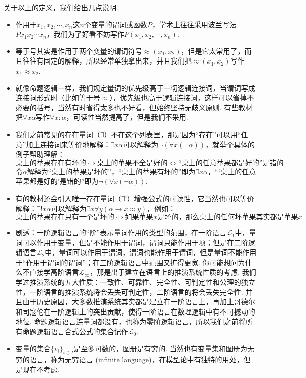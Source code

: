 \documentclass[main.tex]{subfiles}
\begin{document}
关于以上的定义，我们给出几点说明.
\begin{itemize}
    \item 作用于\(x_1, x_2, \cdots, x_n\)这\(n\)个变量的谓词或函数\(P\)，学术上往往采用波兰写法\(Px_1x_2\cdots x_n\)，我们为了好看不妨写作\(P(x_1,x_2,\cdots,x_n)\).
    \item 等于号其实是作用于两个变量的谓词符号\(\approx(x_1,x_2)\)，但是它太常用了，而且往往有固定的解释，所以经常单独拿出来，并且我们把\(\approx(x_1,x_2)\)写作\(x_1 \approx x_2\). 
    \item 就像命题逻辑一样，我们规定量词的优先级高于一切逻辑连接词，当谓词写成连接词形式时（比如等于号\(\approx\)），优先级也高于逻辑连接词，这样可以省掉不必要的括号，当然有时省得太多也不好看，但始终坚持无歧义原则. 有些教材把\(\forall x \alpha\)写作\(\forall x: \alpha\)，可读性当然提高了，但是我们不采用.
    \item 我们之前常见的存在量词（\(\exists\)）不在这个列表里，那是因为“存在”可以用“任意”加上连接词来等价地解释：\(\exists x \alpha\)可以解释为\(\neg(\forall x (\neg\alpha))\)，就举个具体的例子帮助理解：
    \[\mbox{桌上的苹果存在有坏的} \Leftrightarrow \mbox{桌上的苹果不全是好的} \Leftrightarrow \mbox{“桌上的任意苹果都是好的”是错的}\]
    令\(\alpha\)解释为“桌上的苹果是坏的”，“桌上的苹果有坏的”即为\(\exists x \alpha\)，“‘桌上的任意苹果都是好的’是错的”即为\(\neg(\forall x (\neg\alpha))\).
    \item 有的教材还会引入唯一存在量词（\(\exists!\)）增强公式的可读性，它当然也可以等价解释：\(\exists! x \alpha\)可以解释为\(\exists x \forall y(\alpha \to x \approx y)\)，例如：
    \[\mbox{桌上的苹果存在只有一个是坏的} \Leftrightarrow \mbox{如果苹果}x\mbox{是坏的，那么桌上的任何坏苹果其实都是苹果}x \]
    \item 剧透：一阶逻辑语言的“阶”表示量词作用的类型的范围，在一阶语言\(\mathcal{L}_1\)中，量词可以作用于变量，但是不能作用于谓词，谓词只能作用于项；但是在二阶逻辑语言\(\mathcal{L}_2\)中，量词可以作用于谓词，谓词也能作用于谓词，但是量词不能作用于“作用于谓词的谓词”；在三阶逻辑语言中范围又扩得更宽. 你可能想问为什么不直接学高阶语言\(\mathcal{L}_\infty\)，那是出于建立在语言上的推演系统性质的考虑. 我们学过推演系统的五大性质：一致性、可靠性、完全性、可判定性和公理的独立性，一阶语言的推演系统将会丢失可判定性，二阶语言的将会丢失完全性. 并且由于历史原因，大多数推演系统其实都是建立在一阶语言上，再加上哥德尔和司寇伦在一阶逻辑上的突出贡献，使得一阶语言在数理逻辑中有不可撼动的地位. 命题逻辑语言连量词都没有，也称为零阶逻辑语言，所以我们之前将所有命题逻辑语言合式公式的集合记作\(\mathcal{L}_0\).
    \item 变量的集合\(\{v_i\}_{i \in I}\)是至多可数的，图册是有穷的. 当然也有变量集和图册为无穷的语言，称为\uline{无穷语言} (infinite language)，在模型论中有独特的用处，但是现在不考虑.

\end{itemize}
\end{document}
